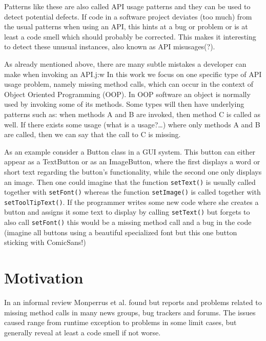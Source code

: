 Patterns like these are also called API usage patterns \cite{robillard2013automated} and they can be used to detect potential defects.
If code in a software project deviates (too much) from the usual patterns when using an API, this hints at a bug or problem or is at least a code smell which should probably be corrected.
This makes it interesting to detect these unusual instances, also known as API misusages(?).

As already mentioned above, there are many subtle mistakes a developer can make when invoking an API.j:w
In this work we focus on one specific type of API usage problem, namely missing method calls, which can occur in the context of Object Oriented Programming (OOP).
In OOP software an object is normally used by invoking some of its methods.
Some types will then have underlying patterns such as: when methods A and B are invoked, then method C is called as well.
If there exists some usage (what is a usage?\ldots) where only methods A and B are called, then we can say that the call to C is missing.

As an example consider a Button class in a GUI system.
This button can either appear as a TextButton or as an ImageButton, where the first displays a word or short text regarding the button's functionality, while the second one only displays an image.
Then one could imagine that the function \texttt{setText()} is usually called together with \texttt{setFont()} whereas the function \texttt{setImage()} is called together with \texttt{setToolTipText()}.
If the programmer writes some new code where she creates a button and assigns it some text to display by calling \texttt{setText()} but forgets to also call \texttt{setFont()} this would be a missing method call and a bug in the code (imagine all buttons using a beautiful specialized font but this one button sticking with ComicSans!)

\section{Motivation}

In an informal review Monperrus et al. \cite{monperrus2013detecting} found but reports and problems related to missing method calls in many news groups, bug trackers and forums.
The issues caused range from runtime exception to problems in some limit cases, but generally reveal at least a code smell if not worse.

